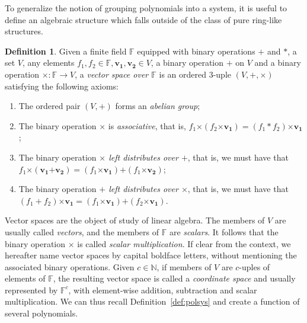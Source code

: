 \documentclass[draft, 12pt, a4paper, oneside]{memoir}
\theoremstyle{definition}
\newtheorem{definition}[theorem]{Definition}
\begin{document}
To generalize the notion of grouping polynomials into a system, it is useful to define an algebraic structure which falls outside of the class of pure ring-like structures.

\begin{definition}
  Given a finite field $\mathbb{F}$ equipped with binary operations $+$ and $\ast$, a set $V$, any elements $f_{1}, f_{2} \in \mathbb{F}, \mathbf{v_{1}}, \mathbf{v_{2}} \in V$, a binary operation $\bm{+}$ on $V$ and a binary operation $\bm{\times} : \mathbb{F} \to V$, a \emph{vector space over $\mathbb{F}$} is an ordered $3$-uple $(V, \bm{+}, \bm{\times})$ satisfying the following axioms:
  
  \begin{enumerate}
    \item The ordered pair $(V, \bm{+})$ forms an \emph{abelian group};
    \item The binary operation $\bm{\times}$ is \emph{associative}, that is, $f_{1} \bm{\times} (f_{2} \bm{\times} \mathbf{v_{1}}) = (f_{1} \ast f_{2}) \bm{\times} \mathbf{v_{1}}$;
    \item The binary operation \emph{$\bm{\times}$ left distributes over $\bm{+}$}, that is, we must have that $f_{1} \bm{\times} (\mathbf{v_{1}} \bm{+} \mathbf{v_{2}}) = (f_{1} \bm{\times} \mathbf{v_{1}}) \bm{+} (f_{1} \bm{\times} \mathbf{v_{2}})$;
    \item The binary operation \emph{$\bm{+}$ left distributes over $\bm{\times}$}, that is, we must have that $(f_{1} + f_{2}) \bm{\times} \mathbf{v_{1}} = (f_{1} \bm{\times} \mathbf{v_{1}}) \bm{+} (f_{2} \bm{\times} \mathbf{v_{1}})$.
  \end{enumerate}
\end{definition}

Vector spaces are the object of study of linear algebra. The members of $V$ are usually called \emph{vectors}, and the members of $\mathbb{F}$ are \emph{scalars}. It follows that the binary operation $\bm{\times}$ is called \emph{scalar multiplication}. If clear from the context, we hereafter name vector spaces by capital boldface letters, without mentioning the associated binary operations. Given $c \in \mathbb{N}$, if members of $V$ are $c$-uples of elements of $\mathbb{F}$, the resulting vector space is called a \emph{coordinate space} and usually represented by $\mathbb{F}^{c}$, with element-wise addition, subtraction and scalar multiplication. We can thus recall Definition~\ref{def:polsys} and create a function of several polynomials.
\end{document}
